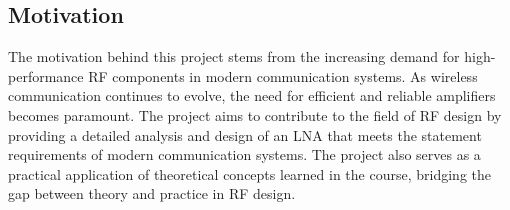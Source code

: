  \subsection{Motivation}
 
 The motivation behind this project stems from the increasing demand for high-performance RF components in modern communication systems. As wireless communication continues to evolve, the need for efficient and reliable amplifiers becomes paramount. The project aims to contribute to the field of RF design by providing a detailed analysis and design of an LNA that meets the statement requirements of modern communication systems. The project also serves as a practical application of theoretical concepts learned in the course, bridging the gap between theory and practice in RF design. 

